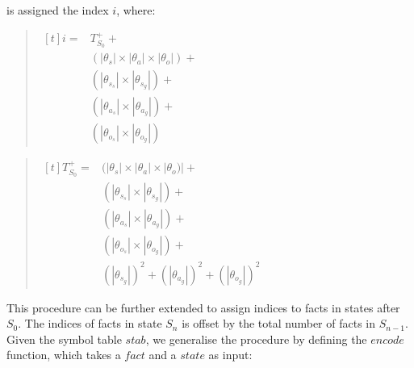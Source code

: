 \documentclass[10pt, twocolumn]{article}
\begin{document}
          is assigned the index $i$, where:

          \begin{quote}
            \begin{math}
              \begin{aligned}[t]
                i = & T^{+}_{S_{0}} + \\
                & (|{\theta}_{s}| \times |{\theta}_{a}| \times |{\theta}_{o}|) + \\
                & (|{\theta}_{s_s}| \times |{\theta}_{s_g}|) + \\
                & (|{\theta}_{a_s}| \times |{\theta}_{a_g}|) + \\
                & (|{\theta}_{o_s}| \times |{\theta}_{o_g}|)
              \end{aligned}
            \end{math}
          \end{quote}
          \begin{quote}
            \begin{math}
              \begin{aligned}[t]
                T^{+}_{S_{0}} = & (|{\theta}_{s}| \times |{\theta}_{a}| \times |{\theta}_{o})| + \\
                & (|{\theta}_{s_s}| \times |{\theta}_{s_g}|) + \\
                & (|{\theta}_{a_s}| \times |{\theta}_{a_g}|) + \\
                & (|{\theta}_{o_s}| \times |{\theta}_{o_g}|) + \\
                & (|{\theta}_{s_g}|)^{2} + (|{\theta}_{a_g}|)^{2} + (|{\theta}_{o_g}|)^{2}
              \end{aligned}
            \end{math}
          \end{quote}

          This procedure can be further extended to assign indices to facts in
          states after $S_{0}$. The indices of facts in state $S_{n}$ is offset
          by the total number of facts in $S_{n - 1}$. Given the symbol table
          $stab$, we generalise the procedure by defining the $encode$
          function, which takes a $fact$ and a $state$ as input:
\end{document}
